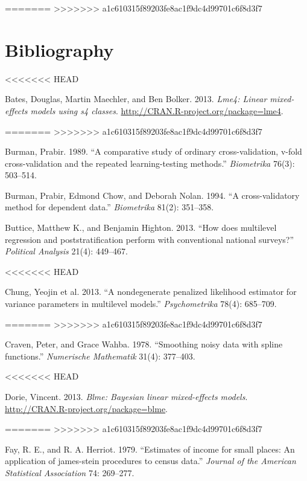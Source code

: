 \documentclass[11pt,article,oneside]{memoir}
\begin{document}
=======
>>>>>>> a1c610315f89203fe8ac1f9dc4d99701c6f8d3f7
\section*{Bibliography}\label{bibliography}

<<<<<<< HEAD
Bates, Douglas, Martin Maechler, and Ben Bolker. 2013. \emph{Lme4:
Linear mixed-effects models using s4 classes}.
\url{http://CRAN.R-project.org/package=lme4}.

=======
>>>>>>> a1c610315f89203fe8ac1f9dc4d99701c6f8d3f7
Burman, Prabir. 1989. ``A comparative study of ordinary
cross-validation, v-fold cross-validation and the repeated
learning-testing methods.'' \emph{Biometrika} 76(3): 503--514.

Burman, Prabir, Edmond Chow, and Deborah Nolan. 1994. ``A
cross-validatory method for dependent data.'' \emph{Biometrika} 81(2):
351--358.

Buttice, Matthew K., and Benjamin Highton. 2013. ``How does multilevel
regression and poststratification perform with conventional national
surveys?'' \emph{Political Analysis} 21(4): 449--467.

<<<<<<< HEAD
Chung, Yeojin et al. 2013. ``A nondegenerate penalized likelihood
estimator for variance parameters in multilevel models.''
\emph{Psychometrika} 78(4): 685--709.

=======
>>>>>>> a1c610315f89203fe8ac1f9dc4d99701c6f8d3f7
Craven, Peter, and Grace Wahba. 1978. ``Smoothing noisy data with spline
functions.'' \emph{Numerische Mathematik} 31(4): 377--403.

<<<<<<< HEAD
Dorie, Vincent. 2013. \emph{Blme: Bayesian linear mixed-effects models}.
\url{http://CRAN.R-project.org/package=blme}.

=======
>>>>>>> a1c610315f89203fe8ac1f9dc4d99701c6f8d3f7
Fay, R. E., and R. A. Herriot. 1979. ``Estimates of income for small
places: An application of james-stein procedures to census data.''
\emph{Journal of the American Statistical Association} 74: 269--277.
\end{document}
